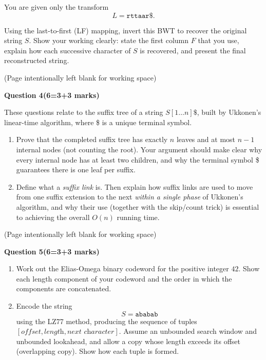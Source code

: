 \documentclass[12pt,letterpaper]{article}
\newcommand{\marksbox}[1]{%
  \vfill
  \begin{flushright}
    \fbox{\parbox[c][1.1cm][c]{1.3cm}{\centering #1}}
  \end{flushright}
}
\newcommand{\questiontitle}[2]{%
  \textbf{Question #1}\hfill\textbf{(#2 marks)}
}
\newcommand{\workingpage}{%
  \newpage
  \begin{center}
    (Page intentionally left blank for working space)
  \end{center}
}
\begin{document}
You are given only the transform
\[
  L = \texttt{rttaar\$}.
\]

Using the last-to-first (LF) mapping, invert this BWT to recover the original
string $S$. Show your working clearly: state the first column $F$ that you use,
explain how each successive character of $S$ is recovered, and present the
final reconstructed string.

\marksbox{6}

\workingpage
\newpage

\questiontitle{4}{6=3+3}

These questions relate to the suffix tree of a string $S[1 \ldots n]\$$, built
by Ukkonen's linear-time algorithm, where \$ is a unique terminal symbol.

\begin{enumerate}
  \item[(i)] Prove that the completed suffix tree has exactly $n$ leaves and at
  most $n - 1$ internal nodes (not counting the root). Your argument should
  make clear why every internal node has at least two children, and why the
  terminal symbol \$ guarantees there is one leaf per suffix.

  \item[(ii)] Define what a \emph{suffix link} is. Then explain how suffix
  links are used to move from one suffix extension to the next \emph{within a
  single phase} of Ukkonen's algorithm, and why their use (together with the
  skip/count trick) is essential to achieving the overall $O(n)$ running time.
\end{enumerate}

\marksbox{6}

\workingpage
\newpage

\questiontitle{5}{6=3+3}

\begin{enumerate}
  \item[(i)] Work out the Elias-Omega binary codeword for the positive integer
  $42$. Show each length component of your codeword and the order in which the
  components are concatenated.

  \item[(ii)] Encode the string
  \[
    S = \texttt{ababab}
  \]
  using the LZ77 method, producing the sequence of tuples
  $[\textit{offset}, \textit{length}, \textit{next character}]$. Assume an
  unbounded search window and unbounded lookahead, and allow a copy whose
  length exceeds its offset (overlapping copy). Show how each tuple is formed.
\end{enumerate}
\end{document}
